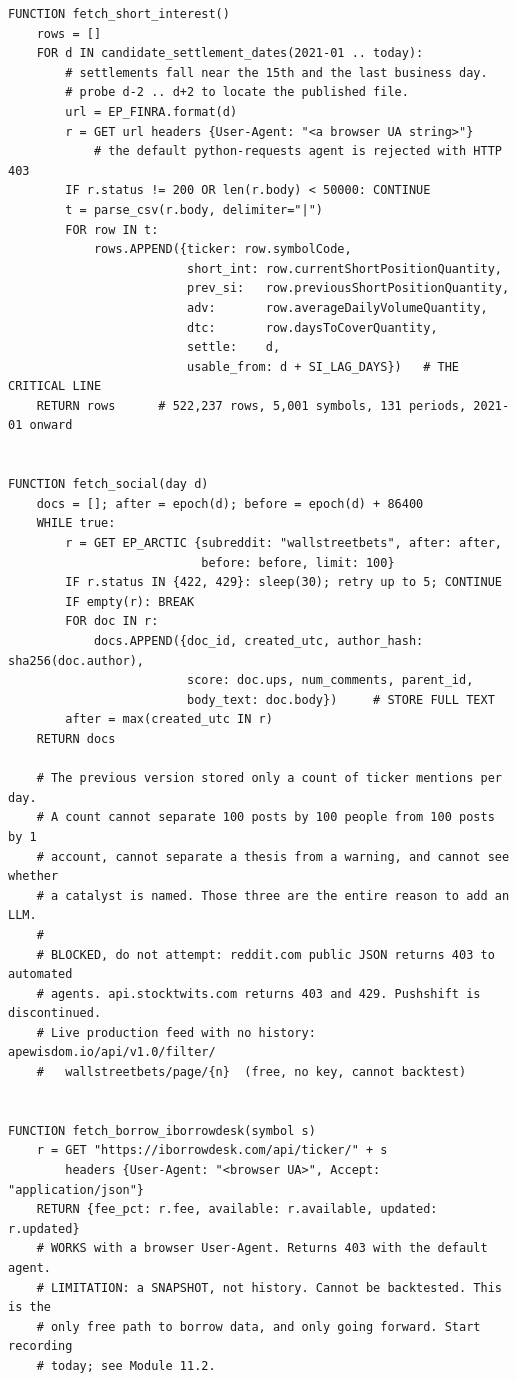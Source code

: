 \documentclass[10pt]{article}
\begin{document}
\begin{lstlisting}
FUNCTION fetch_short_interest()
    rows = []
    FOR d IN candidate_settlement_dates(2021-01 .. today):
        # settlements fall near the 15th and the last business day.
        # probe d-2 .. d+2 to locate the published file.
        url = EP_FINRA.format(d)
        r = GET url headers {User-Agent: "<a browser UA string>"}
            # the default python-requests agent is rejected with HTTP 403
        IF r.status != 200 OR len(r.body) < 50000: CONTINUE
        t = parse_csv(r.body, delimiter="|")
        FOR row IN t:
            rows.APPEND({ticker: row.symbolCode,
                         short_int: row.currentShortPositionQuantity,
                         prev_si:   row.previousShortPositionQuantity,
                         adv:       row.averageDailyVolumeQuantity,
                         dtc:       row.daysToCoverQuantity,
                         settle:    d,
                         usable_from: d + SI_LAG_DAYS})   # THE CRITICAL LINE
    RETURN rows      # 522,237 rows, 5,001 symbols, 131 periods, 2021-01 onward


FUNCTION fetch_social(day d)
    docs = []; after = epoch(d); before = epoch(d) + 86400
    WHILE true:
        r = GET EP_ARCTIC {subreddit: "wallstreetbets", after: after,
                           before: before, limit: 100}
        IF r.status IN {422, 429}: sleep(30); retry up to 5; CONTINUE
        IF empty(r): BREAK
        FOR doc IN r:
            docs.APPEND({doc_id, created_utc, author_hash: sha256(doc.author),
                         score: doc.ups, num_comments, parent_id,
                         body_text: doc.body})     # STORE FULL TEXT
        after = max(created_utc IN r)
    RETURN docs

    # The previous version stored only a count of ticker mentions per day.
    # A count cannot separate 100 posts by 100 people from 100 posts by 1
    # account, cannot separate a thesis from a warning, and cannot see whether
    # a catalyst is named. Those three are the entire reason to add an LLM.
    #
    # BLOCKED, do not attempt: reddit.com public JSON returns 403 to automated
    # agents. api.stocktwits.com returns 403 and 429. Pushshift is discontinued.
    # Live production feed with no history: apewisdom.io/api/v1.0/filter/
    #   wallstreetbets/page/{n}  (free, no key, cannot backtest)


FUNCTION fetch_borrow_iborrowdesk(symbol s)
    r = GET "https://iborrowdesk.com/api/ticker/" + s
        headers {User-Agent: "<browser UA>", Accept: "application/json"}
    RETURN {fee_pct: r.fee, available: r.available, updated: r.updated}
    # WORKS with a browser User-Agent. Returns 403 with the default agent.
    # LIMITATION: a SNAPSHOT, not history. Cannot be backtested. This is the
    # only free path to borrow data, and only going forward. Start recording
    # today; see Module 11.2.



\end{lstlisting}
\end{document}
